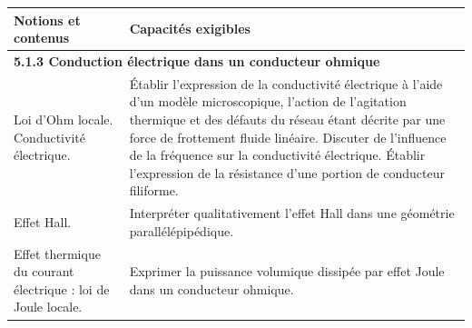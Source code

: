 {\footnotesize
        \begin{tabularx}{\linewidth}{|p{}|X|}
            \hline 
            \textbf{Notions et contenus} & \textbf{Capacités exigibles} \\
            \hline 
            \multicolumn{2}{|l|}{\textbf{5.1.3 Conduction électrique dans un conducteur ohmique}} \\
            \hline
                Loi d'Ohm locale. Conductivité électrique.  & 
                Établir l'expression de la conductivité électrique à l'aide d'un modèle microscopique, l'action de l'agitation thermique et des défauts du réseau étant décrite par une force de frottement fluide linéaire.
Discuter de l'influence de la fréquence sur la conductivité électrique.
Établir l'expression de la résistance d'une portion de conducteur filiforme. \\
            \hline 
             Effet Hall.   & 
            Interpréter qualitativement l'effet Hall dans une géométrie parallélépipédique. \\
        \hline 
        Effet thermique du courant électrique : loi de Joule locale. & 
        Exprimer la puissance volumique dissipée par effet Joule dans un conducteur ohmique. \\ 
        \hline
        \end{tabularx}
\vspace{0.5cm}
}
